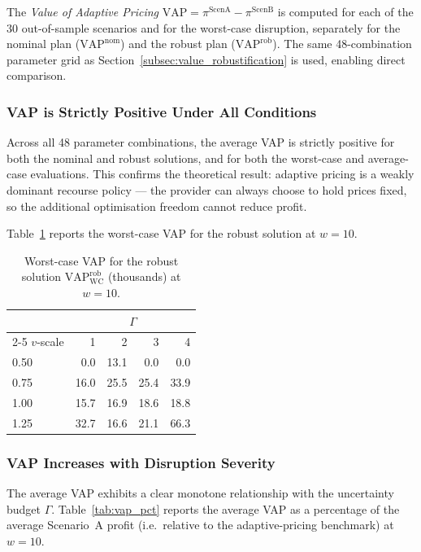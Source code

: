The \emph{Value of Adaptive Pricing}
$\mathrm{VAP} = \pi^{\mathrm{ScenA}} - \pi^{\mathrm{ScenB}}$
is computed for each of the 30 out-of-sample scenarios and for the
worst-case disruption, separately for the nominal plan
($\mathrm{VAP}^{\mathrm{nom}}$) and the robust plan
($\mathrm{VAP}^{\mathrm{rob}}$).
The same 48-combination parameter grid as Section~\ref{subsec:value_robustification}
is used, enabling direct comparison.

\subsubsection*{VAP is Strictly Positive Under All Conditions}

Across all 48 parameter combinations, the average VAP is strictly
positive for both the nominal and robust solutions, and for both the
worst-case and average-case evaluations.
This confirms the theoretical result: adaptive pricing is a weakly
dominant recourse policy — the provider can always choose to hold prices
fixed, so the additional optimisation freedom cannot reduce profit.

Table~\ref{tab:vap_wc} reports the worst-case VAP for the robust
solution at $w = 10$.

\begin{table}[htbp]
\centering
\caption{Worst-case VAP for the robust solution
         $\mathrm{VAP}^{\mathrm{rob}}_{\mathrm{WC}}$ (thousands)
         at $w = 10$.}
\label{tab:vap_wc}
\setlength{\tabcolsep}{6pt}
\begin{tabular}{lrrrr}
\toprule
& \multicolumn{4}{c}{$\Gamma$} \\
\cmidrule(lr){2-5}
$v$-scale & 1 & 2 & 3 & 4 \\
\midrule
0.50 &   0.0 &  13.1 &   0.0 &  0.0 \\
0.75 &  16.0 &  25.5 &  25.4 & 33.9 \\
1.00 &  15.7 &  16.9 &  18.6 & 18.8 \\
1.25 &  32.7 &  16.6 &  21.1 & 66.3 \\
\bottomrule
\end{tabular}
\end{table}

\subsubsection*{VAP Increases with Disruption Severity}

The average VAP exhibits a clear monotone relationship with the
uncertainty budget $\Gamma$.
Table~\ref{tab:vap_pct} reports the average VAP as a percentage of the
average Scenario~A profit (i.e.\ relative to the adaptive-pricing
benchmark) at $w = 10$.

